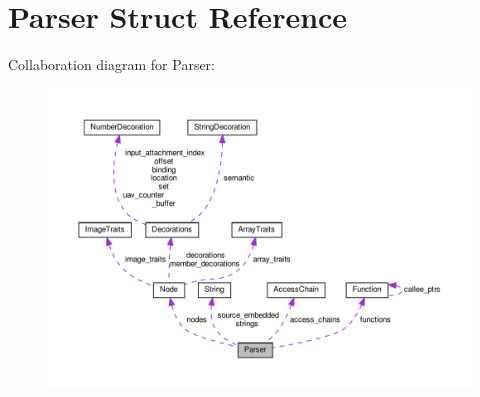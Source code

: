 \hypertarget{structParser}{}\section{Parser Struct Reference}
\label{structParser}


Collaboration diagram for Parser\+:\nopagebreak
\begin{figure}[H]
\begin{center}
\leavevmode
\includegraphics[width=350pt]{structParser__coll__graph}
\end{center}
\end{figure}
